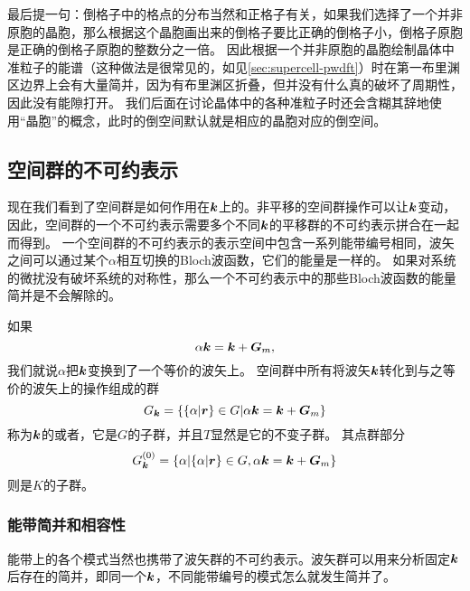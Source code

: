 最后提一句：倒格子中的格点的分布当然和正格子有关，如果我们选择了一个并非原胞的晶胞，那么根据这个晶胞画出来的倒格子要比正确的倒格子小，倒格子原胞是正确的倒格子原胞的整数分之一倍。
因此根据一个并非原胞的晶胞绘制晶体中准粒子的能谱（这种做法是很常见的，如见\autoref{sec:supercell-pwdft}）时在第一布里渊区边界上会有大量简并，因为有布里渊区折叠，但并没有什么真的破坏了周期性，因此没有能隙打开。
我们后面在讨论晶体中的各种准粒子时还会含糊其辞地使用“晶胞”的概念，此时的倒空间默认就是相应的晶胞对应的倒空间。

\subsection{空间群的不可约表示}

现在我们看到了空间群是如何作用在$\vb*{k}$上的。非平移的空间群操作可以让$\vb*{k}$变动，因此，空间群的一个不可约表示需要多个不同$\vb*{k}$的平移群的不可约表示拼合在一起而得到。
一个空间群的不可约表示的表示空间中包含一系列能带编号相同，波矢之间可以通过某个$\alpha$相互切换的Bloch波函数，它们的能量是一样的。
如果对系统的微扰没有破坏系统的对称性，那么一个不可约表示中的那些Bloch波函数的能量简并是不会解除的。

如果
\begin{equation}
    \alpha \vb*{k} = \vb*{k} + \vb*{G}_m,
\end{equation}
我们就说$\alpha$把$\vb*{k}$变换到了一个等价的波矢上。
空间群中所有将波矢$\vb*{k}$转化到与之等价的波矢上的操作组成的群
\begin{equation}
    G_{\vb*{k}} = \{ \{\alpha | \vb*{r}\} \in G | \alpha \vb*{k} = \vb*{k} + \vb*{G}_m \}
\end{equation}
称为$\vb*{k}$的或者，它是$G$的子群，并且$T$显然是它的不变子群。
其点群部分
\begin{equation}
    G_{\vb*{k}}^{(0)} = \{ \alpha | \{\alpha | \vb*{r}\} \in G,  \alpha \vb*{k} = \vb*{k} + \vb*{G}_m \}
\end{equation}
则是$K$的子群。

\subsubsection{能带简并和相容性}

能带上的各个模式当然也携带了波矢群的不可约表示。波矢群可以用来分析固定$\vb*{k}$后存在的简并，即同一个$\vb*{k}$，不同能带编号的模式怎么就发生简并了。

